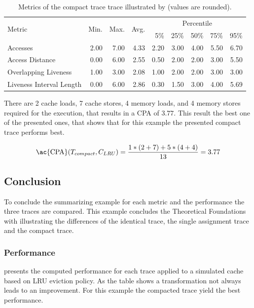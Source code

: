 \documentclass[onecolumn, openright, master, english, signatures]{dbrgrptt}
\begin{document}
\begin{table}[!ht]
  \centering
  \begin{tabular}{lrrrrrrrr}
    \hline
    \multirow{2}{*}{Metric} & \multirow{2}{*}{Min.} & \multirow{2}{*}{Max.} & \multirow{2}{*}{Avg.} & \multicolumn{5}{c}{Percentile} \tabularnewline
    & & & & 5\% & 25\% & 50\% & 75\% & 95\% \tabularnewline
    \hline
    Accesses                 & 2.00 & 7.00 & 4.33 & 2.20 & 3.00 & 4.00 & 5.50 & 6.70 \\
    Access Distance          & 0.00 & 6.00 & 2.55 & 0.50 & 2.00 & 2.00 & 3.00 & 5.50 \\
    Overlapping Liveness     & 1.00 & 3.00 & 2.08 & 1.00 & 2.00 & 2.00 & 3.00 & 3.00 \\
    Liveness Interval Length & 0.00 & 6.00 & 2.86 & 0.30 & 1.50 & 3.00 & 4.00 & 5.69 \\
    \hline
  \end{tabular}
  \caption{Metrics of the compact trace \ac{trace} illustrated by  (values are rounded).}
  \label{tab:summarizing-example-metrics-compact}
\end{table}

There are 2 cache loads, 7 cache stores, 4 memory loads, and 4 memory stores required for the execution, that results in a \ac{CPA} of $3.77$.
This result the best one of the presented ones, that shows that for this example the presented compact trace performs best.

\begin{equation}\label{equ:trace-transformation-compact-marked}
\text{\ac{CPA}}(T_{compact}, C_{LRU}) = \frac{1 * (2 + 7) + 5 * (4 + 4)}{13} = 3.77
\end{equation}

\subsection{Conclusion}
To conclude the summarizing example for each metric and the performance the three \ac{trace}s are compared. This example concludes the Theoretical Foundations with illustrating the differences of the identical \ac{trace}, the single assignment \ac{trace} and the compact \ac{trace}.

\subsubsection{Performance}
 presents the computed performance for each \ac{trace} applied to a simulated cache based on \ac{LRU} eviction policy.
As the table shows a transformation not always leads to an improvement.
For this example the compacted \ac{trace} yield the best performance.
\end{document}
